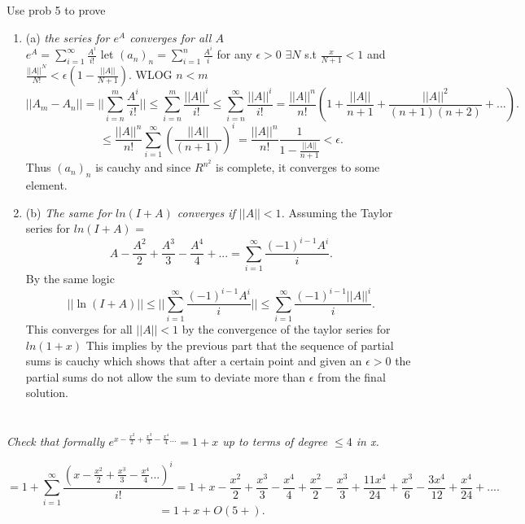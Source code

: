 \documentclass{article}
\begin{document}
    \section{}
    Use prob 5 to prove
    \begin{enumerate}
        \item (a)
            \emph{the series for $e^{A}$ converges for all $A$ }\\
            $e^{A} = \sum_{i=1}^{\infty}\frac{A^{i}}{i!}$
            let $(a_n)_n = \sum_{i=1}^{n}\frac{A^{i}}{i}$ for any $\epsilon > 0$ $\exists N $ s.t $\frac{x}{N+1} < 1$ and $\frac{||A||^{N}}{N!} < \epsilon(1-\frac{||A||}{N+1})$.
            WLOG $n < m$
            \[
            ||A_m - A_n|| = ||\sum_{i=n}^{m}\frac{A^{i}}{i!}|| \le \sum_{i=n}^{m}\frac{||A||^{i}}{i!}  \le \sum_{i=n}^{\infty}\frac{||A||^{i}}{i!} = \frac{||A||^{n}}{n!}(1+ \frac{||A||}{n+1} + \frac{||A||^2}{(n+1)(n+2)}+...)
            .\] 
            \[
            \le \frac{||A||^{n}}{n!}\sum_{i=1}^{\infty}(\frac{||A||}{(n+1)})^{i} = \frac{||A||^{n}}{n!} \frac{1}{1-\frac{||A||}{n+1}} < \epsilon
            .\] 
            Thus $(a_n)_n$ is cauchy and since $R^{n^2}$ is complete, it converges to some element.
        \item (b)
            \emph{The same for $ln(I+A)$ converges if $||A|| < 1$.}
            Assuming the Taylor series for $ln(I+A)$  = 
            \[
                A-\frac{A^2}{2}+\frac{A^{3}}{3}-\frac{A^{4}}{4}+... = \sum_{i=1}^{\infty}\frac{(-1)^{i-1}A^{i}}{i}
            .\] 
            By the same logic
            \[
            ||\ln(I+A)|| \le ||\sum_{i=1}^{\infty}\frac{(-1)^{i-1}A^{i}}{i}|| \le \sum_{i=1}^{\infty}\frac{(-1)^{i-1}||A||^{i}}{i}
            .\] 
            This converges for all $||A|| < 1$ by the convergence of the taylor series for $ln(1+x)$ This implies by the previous part
            that the sequence of partial sums is cauchy which shows that after a certain point and given an  $\epsilon > 0$ the partial sums do not allow the sum to deviate
            more than $\epsilon$ from the final solution.
    \end{enumerate}

    \section{}
    \emph{Check that formally
    $e^{x-\frac{x^2}{2} + \frac{x^{3}}{3}-\frac{x^{4}}{4}...} = 1 + x$ up to terms of degree $\le 4$ in x.}

    \[
    = 1 + \sum_{i=1}^{\infty}\frac{(x-\frac{x^2}{2}+\frac{x^{3}}{3}-\frac{x^{4}}{4}...)^{i}}{i!} = 1 + x -\frac{x^2}{2} + \frac{x^{3}}{3}-\frac{x^{4}}{4} + \frac{x^2}{2} - \frac{x^{3}}{3}+\frac{11x^{4}}{24} + \frac{x^{3}}{6} - \frac{3x^{4}}{12} + \frac{x^{4}}{24} + ...
    .\] 
    \[
    = 1+x + O(5+)
    .\] 
\end{document}
